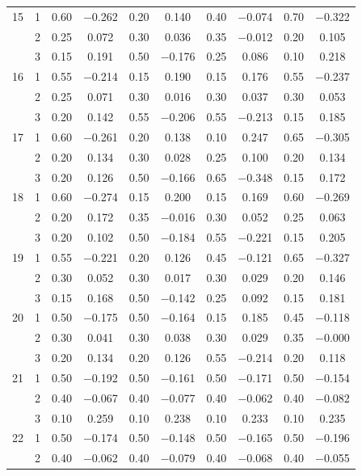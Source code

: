 \begin{longtable}{llcccccccc}
  15 & 1 & 0.60 & $-$0.262 & 0.20 & 0.140 & 0.40 & $-$0.074 & 0.70 & $-$0.322 \\ 
   & 2 & 0.25 & 0.072 & 0.30 & 0.036 & 0.35 & $-$0.012 & 0.20 & 0.105 \\ 
   & 3 & 0.15 & 0.191 & 0.50 & $-$0.176 & 0.25 & 0.086 & 0.10 & 0.218 \\ 
  16 & 1 & 0.55 & $-$0.214 & 0.15 & 0.190 & 0.15 & 0.176 & 0.55 & $-$0.237 \\ 
   & 2 & 0.25 & 0.071 & 0.30 & 0.016 & 0.30 & 0.037 & 0.30 & 0.053 \\ 
   & 3 & 0.20 & 0.142 & 0.55 & $-$0.206 & 0.55 & $-$0.213 & 0.15 & 0.185 \\ 
  17 & 1 & 0.60 & $-$0.261 & 0.20 & 0.138 & 0.10 & 0.247 & 0.65 & $-$0.305 \\ 
   & 2 & 0.20 & 0.134 & 0.30 & 0.028 & 0.25 & 0.100 & 0.20 & 0.134 \\ 
   & 3 & 0.20 & 0.126 & 0.50 & $-$0.166 & 0.65 & $-$0.348 & 0.15 & 0.172 \\ 
  18 & 1 & 0.60 & $-$0.274 & 0.15 & 0.200 & 0.15 & 0.169 & 0.60 & $-$0.269 \\ 
   & 2 & 0.20 & 0.172 & 0.35 & $-$0.016 & 0.30 & 0.052 & 0.25 & 0.063 \\ 
   & 3 & 0.20 & 0.102 & 0.50 & $-$0.184 & 0.55 & $-$0.221 & 0.15 & 0.205 \\ 
  19 & 1 & 0.55 & $-$0.221 & 0.20 & 0.126 & 0.45 & $-$0.121 & 0.65 & $-$0.327 \\ 
   & 2 & 0.30 & 0.052 & 0.30 & 0.017 & 0.30 & 0.029 & 0.20 & 0.146 \\ 
   & 3 & 0.15 & 0.168 & 0.50 & $-$0.142 & 0.25 & 0.092 & 0.15 & 0.181 \\ 
  20 & 1 & 0.50 & $-$0.175 & 0.50 & $-$0.164 & 0.15 & 0.185 & 0.45 & $-$0.118 \\ 
   & 2 & 0.30 & 0.041 & 0.30 & 0.038 & 0.30 & 0.029 & 0.35 & $-$0.000 \\ 
   & 3 & 0.20 & 0.134 & 0.20 & 0.126 & 0.55 & $-$0.214 & 0.20 & 0.118 \\ 
  21 & 1 & 0.50 & $-$0.192 & 0.50 & $-$0.161 & 0.50 & $-$0.171 & 0.50 & $-$0.154 \\ 
   & 2 & 0.40 & $-$0.067 & 0.40 & $-$0.077 & 0.40 & $-$0.062 & 0.40 & $-$0.082 \\ 
   & 3 & 0.10 & 0.259 & 0.10 & 0.238 & 0.10 & 0.233 & 0.10 & 0.235 \\ 
  22 & 1 & 0.50 & $-$0.174 & 0.50 & $-$0.148 & 0.50 & $-$0.165 & 0.50 & $-$0.196 \\ 
   & 2 & 0.40 & $-$0.062 & 0.40 & $-$0.079 & 0.40 & $-$0.068 & 0.40 & $-$0.055 \\ 

\end{longtable}
